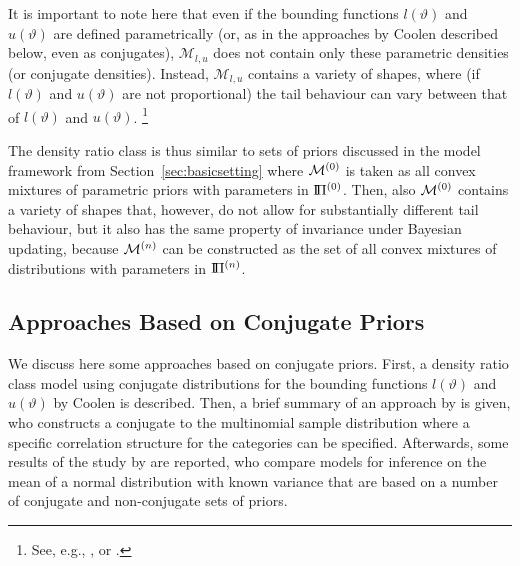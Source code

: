 It is important to note here that even if the bounding functions $l(\vartheta)$ and $u(\vartheta)$ are defined parametrically
(or, as in the approaches by Coolen \parencite*{1993:coolen, 1994:coolen} described below, even as conjugates),
$\mathcal{M}_{l,u}$ does not contain only these parametric densities (or conjugate densities).
Instead, $\mathcal{M}_{l,u}$ contains a variety of shapes, where
(if $l(\vartheta)$ and $u(\vartheta)$ are not proportional)
the tail behaviour can vary between that of $l(\vartheta)$ and $u(\vartheta)$.%
\footnote{See, e.g., \cite[\S 3.2]{2011:rinderknecht}, or \cite[\S 4.3]{1991:pericchi}.}

The density ratio class is thus similar to sets of priors
discussed in the model framework from Section~\ref{sec:basicsetting} where
$\mathcal{M}^{(0)}$ is taken as all convex mixtures of parametric priors with parameters in $\text{I}\!\Pi^{(0)}$.
Then, also $\mathcal{M}^{(0)}$ contains a variety of shapes that, however,
do not allow for substantially different tail behaviour,
but it also has the same property of invariance under Bayesian updating,
because $\mathcal{M}^{(n)}$ can be constructed as the set of all convex mixtures of distributions with parameters in $\text{I}\!\Pi^{(n)}$.



\subsection{Approaches Based on Conjugate Priors}
\label{sec:alternatives:conjugate}

We discuss here some approaches based on conjugate priors.
First, a density ratio class model using conjugate distributions
for the bounding functions $l(\vartheta)$ and $u(\vartheta)$
by Coolen \parencite*{1993:coolen,1994:coolen} is described.
Then, a brief summary of an approach by \textcite{2009:bickis} is given,
who constructs a conjugate to the multinomial sample distribution
where a specific correlation structure for the categories can be specified.
Afterwards, some results of the study by \textcite{1991:pericchi} are reported,
who compare models for inference on the mean of a normal distribution with known variance
that are based on a number of conjugate and non-conjugate sets of priors.
 


